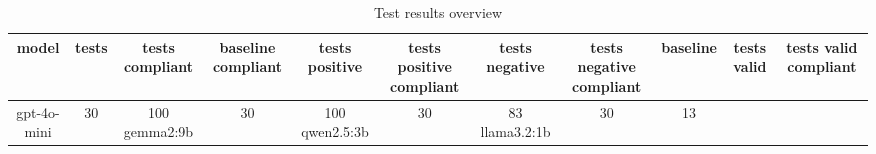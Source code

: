
  \begin{table}[h!]
  \centering
  \begin{tabular}{|c|c|c|c|c|c|c|c|c|c|c|}
  \hline
  model & tests & tests compliant & baseline compliant & tests positive & tests positive compliant & tests negative & tests negative compliant & baseline & tests valid & tests valid compliant \\
  \hline
  gpt-4o-mini & 30 & 100%
\hline
gemma2:9b & 30 & 100%
\hline
qwen2.5:3b & 30 & 83%
\hline
llama3.2:1b & 30 & 13%
  \end{tabular}
  \caption{Test results overview}
  
  \end{table}
  